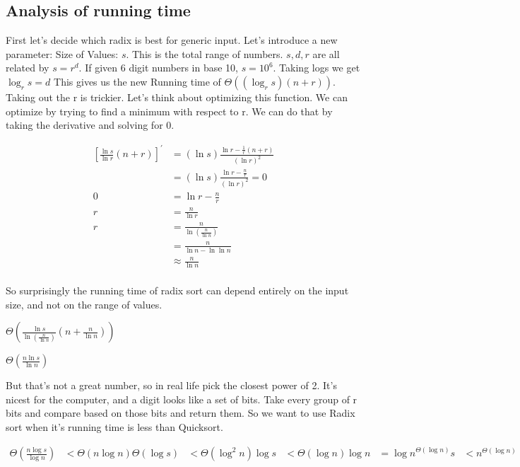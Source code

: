 \documentclass[english, 10pt]{article}
\begin{document}
\subsection{Analysis of running time}

First let's decide which radix is best for generic input. Let's introduce a new
parameter: Size of Values: $s$. This is the total range of numbers. $s,d,r$ are
all related by $s=r^d$. If given 6 digit numbers in base 10, $s=10^6$. Taking
logs we get $\log_r s = d$ This gives us the new Running time of $\Theta(
(\log_r s)(n+r))$. Taking out the r is trickier. Let's think about optimizing
this function. We can optimize by trying to find a minimum with respect to r.
We can do that by taking the derivative and solving for 0.

\begin{align*}
    {\left[\frac{\ln s}{\ln r}(n+r) \right]}^{\prime} & = (\ln s) \frac{\ln r - \frac{1}{r}(n+r)}{{(\ln r)}^2} \\
                                                      & = (\ln s) \frac{\ln r -\frac{n}{r}}{{(\ln r)}^2} = 0 \\
    0                                                 & = \ln r - \frac{n}{r}  \\
    r                                                 & = \frac{n}{\ln r}  \\
    r                                                 & = \frac{n}{\ln ( \frac{n}{\ln n}) } \\
                                                      & = \frac{n}{\ln n - \ln\ln n} \\
                                                      & \approx \frac{n}{\ln n} \\
\end{align*}

So surprisingly the running time of radix sort can depend entirely on the input size, and not on the range of values.

$\Theta(\frac{\ln s}{\ln(\frac{n}{\ln n})}(n+\frac{n}{\ln n}))$

$\Theta(\frac{n \ln s}{\ln n} )$

But that's not a great number, so in real life pick the closest power of 2.
It's nicest for the computer, and a digit looks like a set of bits. Take every
group of r bits and compare based on those bits and return them. So we want to
use Radix sort when it's running time is less than Quicksort.

\begin{align*}
\Theta\left( \frac{n\log s}{\log n } \right) &< \Theta\left( n \log n \right)
\Theta\left( \log s \right) &< \Theta\left( \log^2 n \right)
\log s &< \Theta\left( \log n \right)\log n
&={\log n}^{\Theta(\log n)}
s&<n^{\Theta\left( \log n \right)}
\end{align*}
\end{document}
